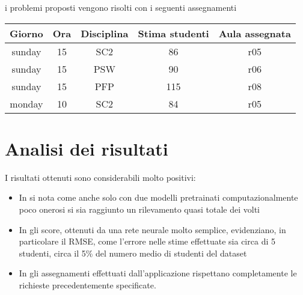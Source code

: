 \noindent
i problemi proposti vengono risolti con i seguenti assegnamenti

\begin{table}[h]
    \begin{small}
        \begin{center}
            \begin{tabular}[c]{c|c|c|c|c}
                Giorno & Ora & Disciplina & Stima studenti & Aula assegnata \\
                \hline
                sunday & 15 & SC2 & 86 & r05 \\
                sunday & 15 & PSW & 90 & r06 \\
                sunday & 15 & PFP & 115 & r08 \\
                monday & 10 & SC2 & 84 & r05
            \end{tabular}
        \end{center}
    \end{small}
\end{table}

\section{Analisi dei risultati}

I risultati ottenuti sono considerabili molto positivi:

\begin{itemize}
    \item In \textbf{} si nota come anche solo con due modelli pretrainati
        computazionalmente poco onerosi si sia raggiunto un rilevamento quasi totale dei volti
    \item In \textbf{} gli score, ottenuti da una rete neurale molto semplice,
        evidenziano, in particolare il RMSE, come l'errore nelle stime effettuate sia circa 
        di 5 studenti, circa il 5\% del numero medio di studenti del dataset
    \item In \textbf{} gli assegnamenti effettuati dall'applicazione rispettano
        completamente le richieste precedentemente specificate.
\end{itemize}
